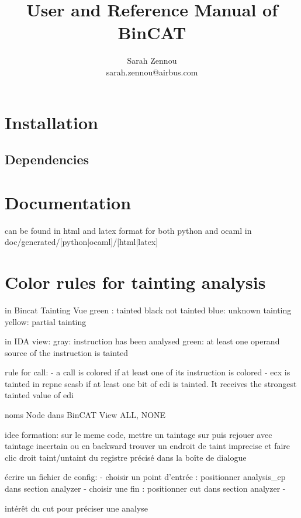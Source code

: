 \documentclass{report}
\title{User and Reference Manual of BinCAT}
\author{Sarah Zennou\\sarah.zennou@airbus.com}
\begin{document}
\maketitle
\tableofcontents
\chapter{Installation}

\section{Dependencies}
\chapter{Documentation}

can be found in html and latex format for both python and ocaml \newline
in doc/generated/[python|ocaml]/[html|latex]

\chapter{Color rules for tainting analysis}
in Bincat Tainting Vue
green : tainted
black not tainted
blue: unknown tainting
yellow: partial tainting

in IDA view:
gray: instruction has been analysed
green: at least one operand source of the instruction is tainted

rule for call:
- a call is colored if at least one of its instruction is colored
- ecx is tainted in repne scasb if at least one bit of edi is tainted. It receives the strongest tainted value of edi

noms Node dans BinCAT View
ALL, NONE

idee formation:
sur le meme code, mettre un taintage sur puis rejouer avec taintage incertain ou en backward
trouver un endroit de taint imprecise et faire clic droit taint/untaint du registre précisé dans la boîte de dialogue

écrire un fichier de config:
- choisir un point d'entrée : positionner analysis\_ep dans section analyzer
- choisir une fin : positionner cut dans section analyzer
- 

intérêt du cut pour préciser une analyse
\end{document}
